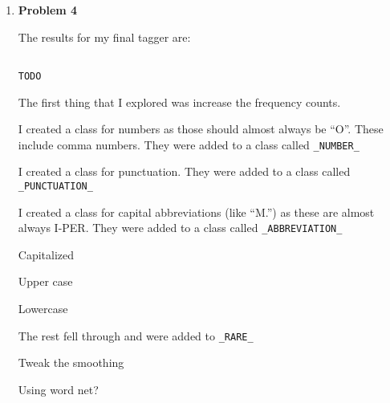 \documentclass[10pt]{article}
\begin{document}
\begin{enumerate}
\newpage

\item {\bf Problem 4}

The results for my final tagger are:

\begin{verbatim}

TODO

\end{verbatim}


The first thing that I explored was increase the frequency counts.

I created a class for numbers as those should almost always be ``O''. These include comma numbers. They were added to a class called {\tt \_NUMBER\_}

I created a class for punctuation. They were added to a class called {\tt \_PUNCTUATION\_}

I created a class for capital abbreviations (like ``M.'') as these are almost always I-PER. They were added to a class called {\tt \_ABBREVIATION\_}

Capitalized

Upper case 

Lowercase

The rest fell through and were added to {\tt \_RARE\_}

Tweak the smoothing


Using word net?

\end{enumerate}
\end{document}
